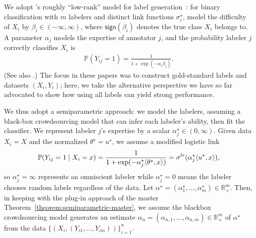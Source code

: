 \documentclass[11pt]{article}
\newcommand{\cc}[1]{\textcolor{cc}{[CC: #1]}}
\newcommand{\ha}[1]{\textcolor{ha}{[HA: #1]}}
\newcommand{\Prb}{\mathbb{P}}
\newcommand{\R}{\mathbb{R}} %
\newcommand{\sgn}{\mathsf{sign}}
\newcommand{\lr}{^{\textup{lr}}}
\newcommand{\<}{\langle} %
\renewcommand{\>}{\rangle}
\newcommand{\opt}{^\star}
\begin{document}
We adopt \citeauthor{WhitehillWuBeMoRu09}'s roughly ``low-rank'' model for
label generation~\citep{WhitehillWuBeMoRu09}: for binary classification with
$m$ labelers and distinct link functions $\sigma_i\opt$, model the
difficulty of $X_i$ by $\beta_i \in (-\infty, \infty)$, where
$\sgn(\beta_i)$ denotes the true class $X_i$ belongs to.  A parameter
$\alpha_j$ models the expertise of annotator $j$, and the probability
labeler $j$ correctly classifies $X_i$ is
\begin{align*}
  \Prb(Y_{ij} = 1) = \frac{1}{1 +\exp(-\alpha_i \beta_j)}.
\end{align*}
(See also \citet{RaykarYuZhVaFlBoMo10}.) 
The focus in these papers was to construct gold-standard labels
and datasets $(X_i, Y_i)$; here, we take the alternative perspective
we have so far advocated to show how using all labels can yield strong
performance.


We thus adopt a semiparametric approach: we model the labelers, assuming a
black-box crowdsourcing model that can infer each labeler's ability, then
fit the classifier.  We represent labeler $j$'s expertise by a scalar
$\alpha_j\opt \in (0, \infty)$. Given data $X_i = X$ and the normalized
$\theta\opt = u\opt$, we assume a modified logistic link
\begin{align*}
  \Prb(Y_{ij} = 1 \mid X_i = x) = \frac{1}{1 + \exp (-\alpha\opt_j  \< \theta\opt, x \>)} = \sigma\lr (\alpha_j\opt  \< u \opt, x \>),
\end{align*}
so $\alpha_j\opt = \infty$ represents an omniscient labeler while
$\alpha_j\opt = 0$ means the labeler chooses random labels regardless of the
data. Let $\alpha\opt = (\alpha_1\opt, \ldots, \alpha_m\opt) \in
\R^m_{+}$. Then, in keeping with the plug-in approach of the master
Theorem~\ref{theorem:semiparametric-master}, we assume the blackbox
crowdsourcing model generates an estimate $\alpha_n = (\alpha_{n,1},
\ldots, \alpha_{n,m}) \in \R_+^m$ of $\alpha^\star$ from the data $\{(X_i,
(Y_{i1}, \ldots, Y_{im}))\}_{i=1}^n$.


\end{document}
